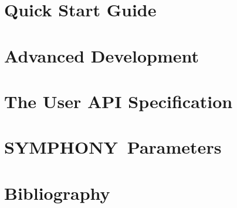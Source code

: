 \documentclass[twoside,11pt]{article}
\newcommand{\BB}{{\sc SYMPHONY}}
\begin{document}
\newpage

\tableofcontents

\newpage

\setcounter{page}{1}



\section{Quick Start Guide}
\label{getting_started}


\section{Advanced Development}
\label{development}


\newpage


%

\section{The User API Specification}
\label{API}
\sloppy


\newpage



\newpage



\newpage








%

%

%

%

%

%


\newpage

\section{\BB\ Parameters}
\label{params}


\newpage

\section{Bibliography}




%
\end{document}
